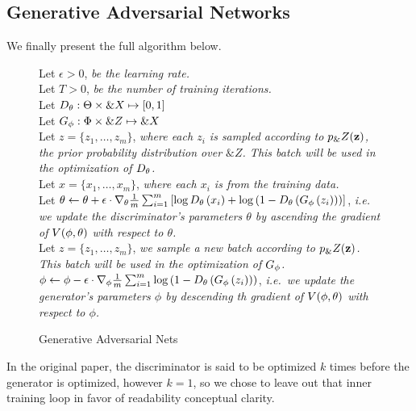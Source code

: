 \subsection{Generative Adversarial Networks}

We finally present the full algorithm below.

\begin{figure}[H] \centering
  \begin{minipage}{0.95\linewidth}
    \begin{algorithm}[H]
      Let $\epsilon > 0$, \textit{be the learning rate.} \\
      Let $T > 0$, \textit{be the number of training iterations.} \\
      Let $D_\theta: \Theta \times \&X \mapsto [0, 1]$ \\
      Let $G_\phi: \Phi \times \&Z \mapsto \&X$ \\
       {
        Let $z = \{z_1, \dots, z_m\}$,
        \textit{where each $z_i$ is sampled according to $p_\&Z(\mathbf{z})$, the
          prior probability distribution over
          $\&Z$.  This batch will be used in the optimization of $D_\theta$.} \\
      Let $x = \{x_1, \dots, x_m\}$, \textit{where each $x_i$
is from the training data.} \\
      Let $\theta \gets \theta + \epsilon \cdot \nabla_{\theta} {1
\over m} \sum_{i=1}^m \left[ \log{D_\theta\left( x_i\right)} +
\log{\left(1 - D_\theta\left(G_\phi\left( z_i\right)\right)\right)} \right]$,
\textit{i.e.  we update the discriminator's parameters $\theta$ by
ascending the gradient of $V(\phi, \theta)$ with respect to $\theta$.} \\
      Let $z = \{z_1, \dots, z_m\}$, \textit{we sample a new
batch according to $p_\&Z(\mathbf{z})$. This batch will be used in the optimization
of $G_\phi$.} \\

$\phi \gets \phi - \epsilon \cdot \nabla_{\phi} {1 \over m }
\sum_{i=1}^m \log{\left(1 -
    D_\theta\left(G_\phi\left(z_i\right)\right)\right)}$, \textit{i.e.\ we
  update the generator's parameters $\phi$ by descending th gradient
  of $V(\phi, \theta)$ with respect to $\phi$.} \\ }
    \caption{Generative Adversarial Nets}
    \label{algo:main-algo}
  \end{algorithm}
  \end{minipage}
\end{figure}

In the original paper, the discriminator is said to be optimized $k$
times before the generator is optimized, however $k=1$, so we chose to
leave out that inner training loop in favor of readability conceptual
clarity.


